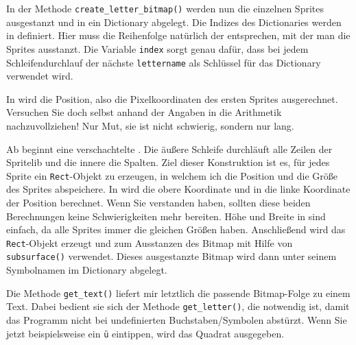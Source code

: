 
In der Methode \texttt{create\_letter\_bitmap()} werden nun die einzelnen Sprites ausgestanzt und in ein Dictionary abgelegt. Die Indizes des Dictionaries werden in  definiert. Hier muss die Reihenfolge natürlich der entsprechen, mit der man die Sprites ausstanzt. Die Variable \texttt{index} sorgt genau dafür, dass bei jedem Schleifendurchlauf der nächste \texttt{lettername} als Schlüssel für das Dictionary verwendet wird.

In  wird die Position, also die Pixelkoordinaten des ersten Sprites ausgerechnet. Versuchen Sie doch selbst anhand der Angaben in  die Arithmetik nachzuvollziehen! Nur Mut, sie ist nicht schwierig, sondern nur lang.

Ab  beginnt eine verschachtelte \forSchleife. Die äußere Schleife durchläuft alle Zeilen der Spritelib und die innere die Spalten. Ziel dieser Konstruktion ist es, für jedes Sprite ein \texttt{Rect}-Objekt zu erzeugen, in welchem ich die Position und die Größe des Sprites abspeichere. In  wird die obere Koordinate und in  die linke Koordinate der Position berechnet. Wenn Sie  verstanden haben, sollten diese beiden Berechnungen keine Schwierigkeiten mehr bereiten. Höhe und Breite in  sind einfach, da alle Sprites immer die gleichen Größen haben. Anschließend wird das \texttt{Rect}-Objekt erzeugt und zum Ausstanzen des Bitmap mit Hilfe von \texttt{subsurface()} verwendet. Dieses ausgestanzte Bitmap wird dann unter seinem Symbolnamen im Dictionary abgelegt.





Die Methode \texttt{get\_text()} liefert mir letztlich die passende Bitmap-Folge zu einem Text. Dabei bedient sie sich der Methode \texttt{get\_letter()}, die notwendig ist, damit das Programm nicht bei undefinierten Buchstaben/Symbolen abstürzt. Wenn Sie jetzt beispielsweise ein \texttt{ü} eintippen, wird das Quadrat ausgegeben.

